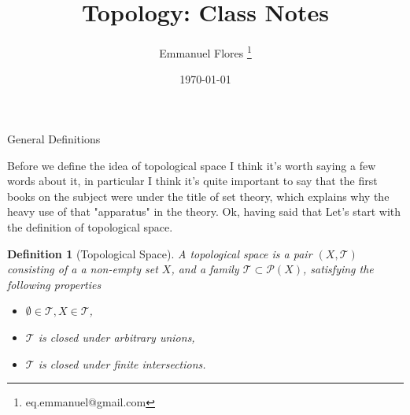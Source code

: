 \documentclass[12pt]{article}
\title{Topology: Class Notes}
\author{Emmanuel Flores \thanks{eq.emmanuel@gmail.com}}
\date{\today}
\newtheorem{definition}{Definition}
\begin{document}
\maketitle


\begin{section}{General Definitions}

Before we define the idea of topological space I think it's worth saying a few words about it, in particular I think it's quite important to say that the first books on the subject were under the title of set theory, which explains why the heavy use of that "apparatus" in the theory. Ok, having said that Let's start with the definition of topological space.


\begin{tcolorbox}[title=Topological Space]
	\begin{definition}[Topological Space]
	 A topological space is a pair $(X,\mathcal{T})$ consisting of a a non-empty set $X$, and a family $\mathcal{T}\subset \mathcal{P}(X)$, satisfying the following properties \begin{itemize}
  			\item $\emptyset\in \mathcal{T},X\in \mathcal{T}$,
  			\item $\mathcal{T}$ is closed under arbitrary unions,
  			\item $\mathcal{T}$ is closed under finite intersections.
		\end{itemize}

	\end{definition}
\end{tcolorbox}

\end{section}
\end{document}
